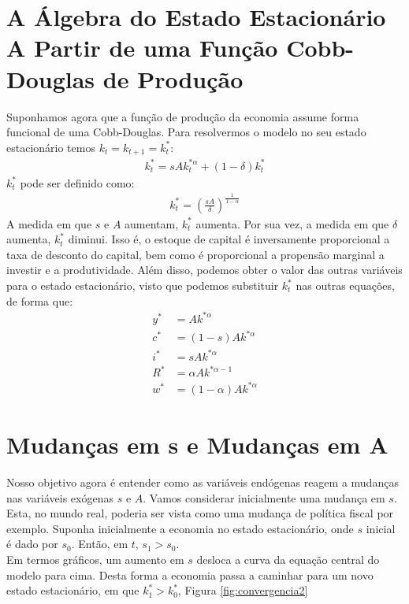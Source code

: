 \documentclass[11pt,a4paper]{article}
\begin{document}
\section{A Álgebra do Estado Estacionário A Partir de uma Função Cobb-Douglas de Produção}
Suponhamos agora que a função de produção da economia assume forma funcional de uma Cobb-Douglas. Para resolvermos o modelo no seu estado estacionário temos $k_t = k_{t+1} = k_t ^{\ast}$:
\begin{align}
k_t ^{\ast} = sAk_t ^{\ast \alpha} + (1-\delta)k_t ^{\ast}
\end{align}
\noindent
$k_t ^{\ast}$ pode ser definido como:
\begin{align}
k_t ^{\ast} = \left(\frac{sA}{\delta}\right)^{\frac{1}{1-\alpha}}
\end{align}
A medida em que $s$ e $A$ aumentam, $k_t ^{\ast}$ aumenta. Por sua vez, a medida em que $\delta$ aumenta, $k_t ^{\ast}$ diminui. Isso é, o estoque de capital é inversamente proporcional a taxa de desconto do capital, bem como é proporcional a propensão marginal a investir e a produtividade. Além disso, podemos obter o valor das outras variáveis para o estado estacionário, visto que podemos substituir $k_t ^{\ast}$ nas outras equações, de forma que:
\begin{align}
y^{\ast} &= Ak^{\ast \alpha} \\
c^{\ast} &= (1-s)Ak^{\ast \alpha}\\
i^{\ast} &= sAk^{\ast \alpha} \\
R^{\ast} &= \alpha A k^{\ast \alpha - 1}\\
w^{\ast} &= (1-\alpha)Ak^{\ast \alpha}  
\end{align}
\section{Mudanças em s e Mudanças em A}

Nosso objetivo agora é entender como as variáveis endógenas reagem a mudanças nas variáveis exógenas $s$ e $A$. Vamos considerar inicialmente uma mudança em $s$. Esta, no mundo real, poderia ser vista como uma mudança de política fiscal por exemplo. Suponha inicialmente a economia no estado estacionário, onde $s$ inicial é dado por $s_0$. Então, em $t$, $s_1 > s_0$.\\

Em termos gráficos, um aumento em $s$ desloca a curva da equação central do modelo para cima. Desta forma a economia passa a caminhar para um novo estado estacionário, em que $k_1^{\ast} > k_0^{\ast}$, Figura \ref{fig:convergencia2}  
\end{document}
